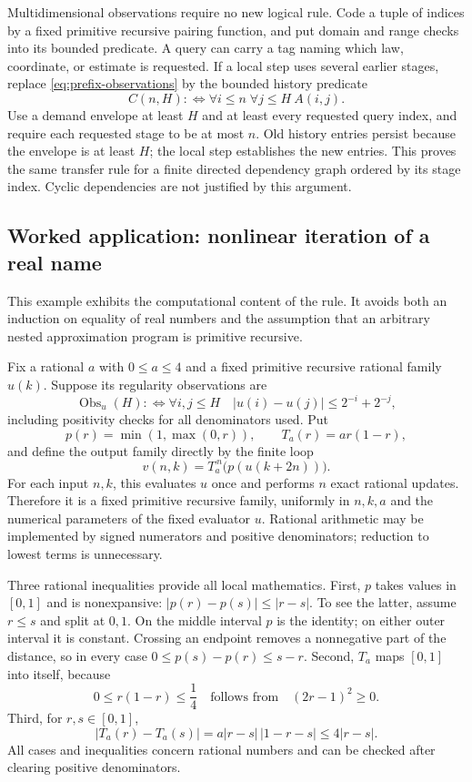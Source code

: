 Multidimensional observations require no new logical rule.  Code a tuple
of indices by a fixed primitive recursive pairing function, and put
domain and range checks into its bounded predicate.  A query can carry a
tag naming which law, coordinate, or estimate is requested.  If a local
step uses several earlier stages, replace \eqref{eq:prefix-observations}
by the bounded history predicate
\[
             C(n,H):\Longleftrightarrow
                  \forall i\le n\;\forall j\le H\ A(i,j).
\]
Use a demand envelope at least $H$ and at least every requested query
index, and require each requested stage to be at most $n$.  Old history
entries persist because the envelope is at least $H$; the local step
establishes the new entries.  This proves the same transfer rule for a
finite directed dependency graph ordered by its stage index.  Cyclic
dependencies are not justified by this argument.

\subsection{Worked application: nonlinear iteration of a real name}
\label{subsec:nonlinear-name-iteration}

This example exhibits the computational content of the rule.  It avoids
both an induction on equality of real numbers and the assumption that
an arbitrary nested approximation program is primitive recursive.

Fix a rational $a$ with $0\le a\le4$ and a fixed primitive recursive
rational family $u(k)$.  Suppose its regularity observations are
\[
 \operatorname{Obs}_u(H):\Longleftrightarrow
  \forall i,j\le H\quad
       |u(i)-u(j)|\le2^{-i}+2^{-j},
\]
including positivity checks for all denominators used.  Put
\[
 p(r)=\min(1,\max(0,r)),\qquad T_a(r)=ar(1-r),
\]
and define the output family directly by the finite loop
\begin{equation}\label{eq:nonlinear-name-definition}
                v(n,k)=T_a^{\,n}\bigl(p(u(k+2n))\bigr).
\end{equation}
For each input $n,k$, this evaluates $u$ once and performs $n$ exact
rational updates.  Therefore it is a fixed primitive recursive family,
uniformly in $n,k,a$ and the numerical parameters of the fixed evaluator
$u$.  Rational arithmetic may be implemented by signed numerators and
positive denominators; reduction to lowest terms is unnecessary.

Three rational inequalities provide all local mathematics.  First,
$p$ takes values in $[0,1]$ and is nonexpansive:
$|p(r)-p(s)|\le|r-s|$.  To see the latter, assume $r\le s$ and split at
$0,1$.  On the middle interval $p$ is the identity; on either outer
interval it is constant.  Crossing an endpoint removes a nonnegative
part of the distance, so in every case
$0\le p(s)-p(r)\le s-r$.
Second, $T_a$ maps $[0,1]$ into itself, because
\[
       0\le r(1-r)\le\frac14
       \quad\text{follows from}\quad (2r-1)^2\ge0.
\]
Third, for $r,s\in[0,1]$,
\begin{equation}\label{eq:logistic-lipschitz}
 |T_a(r)-T_a(s)|
    =a|r-s|\,|1-r-s|\le4|r-s|.
\end{equation}
All cases and inequalities concern rational numbers and can be checked
after clearing positive denominators.

